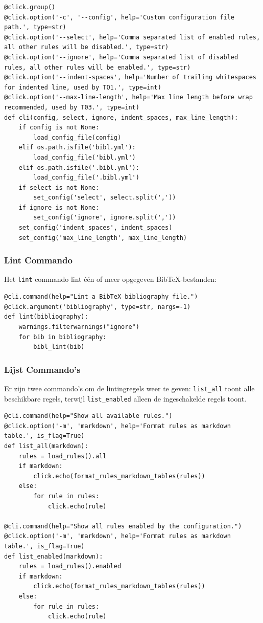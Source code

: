 \begin{verbatim}
@click.group()
@click.option('-c', '--config', help='Custom configuration file path.', type=str)
@click.option('--select', help='Comma separated list of enabled rules, all other rules will be disabled.', type=str)
@click.option('--ignore', help='Comma separated list of disabled rules, all other rules will be enabled.', type=str)
@click.option('--indent-spaces', help='Number of trailing whitespaces for indented line, used by TO1.', type=int)
@click.option('--max-line-length', help='Max line length before wrap recommended, used by T03.', type=int)
def cli(config, select, ignore, indent_spaces, max_line_length):
    if config is not None:
        load_config_file(config)
    elif os.path.isfile('bibl.yml'):
        load_config_file('bibl.yml')
    elif os.path.isfile('.bibl.yml'):
        load_config_file('.bibl.yml')
    if select is not None:
        set_config('select', select.split(','))
    if ignore is not None:
        set_config('ignore', ignore.split(','))
    set_config('indent_spaces', indent_spaces)
    set_config('max_line_length', max_line_length)
\end{verbatim}

\subsubsection{Lint Commando}

Het \texttt{lint} commando lint één of meer opgegeven BibTeX-bestanden:

\begin{verbatim}
@cli.command(help="Lint a BibTeX bibliography file.")
@click.argument('bibliography', type=str, nargs=-1)
def lint(bibliography):
    warnings.filterwarnings("ignore")
    for bib in bibliography:
        bibl_lint(bib)
\end{verbatim}

\subsubsection{Lijst Commando's}

Er zijn twee commando's om de lintingregels weer te geven: \texttt{list\_all} toont alle beschikbare regels, terwijl \texttt{list\_enabled} alleen de ingeschakelde regels toont.

\begin{verbatim}
@cli.command(help="Show all available rules.")
@click.option('-m', 'markdown', help='Format rules as markdown table.', is_flag=True)
def list_all(markdown):
    rules = load_rules().all
    if markdown:
        click.echo(format_rules_markdown_tables(rules))
    else:
        for rule in rules:
            click.echo(rule)

@cli.command(help="Show all rules enabled by the configuration.")
@click.option('-m', 'markdown', help='Format rules as markdown table.', is_flag=True)
def list_enabled(markdown):
    rules = load_rules().enabled
    if markdown:
        click.echo(format_rules_markdown_tables(rules))
    else:
        for rule in rules:
            click.echo(rule)
\end{verbatim}

